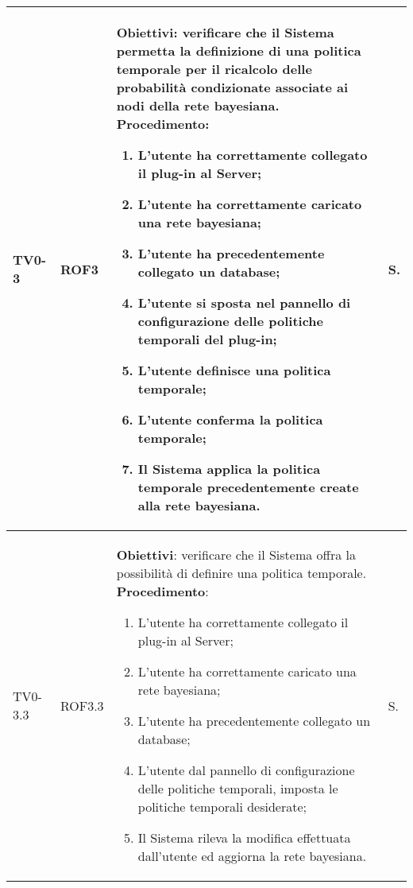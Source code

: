\begin{longtable}{|C{.15\textwidth}|C{.13\textwidth}|m{.65\textwidth}|C{.08\textwidth}|}
TV0-3 & ROF3 &
	\textbf{Obiettivi}: verificare che il Sistema permetta la definizione di una politica temporale per il ricalcolo delle probabilità condizionate associate ai nodi della rete bayesiana. \newline
	\textbf{Procedimento}:
	\begin{enumerate}
		\item L'utente ha correttamente collegato il plug-in al Server;
		\item L'utente ha correttamente caricato una rete bayesiana;
		\item L'utente ha precedentemente collegato un database;
		\item L'utente si sposta nel pannello di configurazione delle politiche temporali del plug-in;
		\item L'utente definisce una politica temporale;
		\item L'utente conferma la politica temporale;
		\item Il Sistema applica la politica temporale precedentemente create alla rete bayesiana.
	\end{enumerate}
	& S. \\
\hline

TV0-3.3 & ROF3.3 &
	\textbf{Obiettivi}: verificare che il Sistema offra la possibilità di definire una politica temporale. \newline
	\textbf{Procedimento}:
	\begin{enumerate}
		\item L'utente ha correttamente collegato il plug-in al Server;
		\item L'utente ha correttamente caricato una rete bayesiana;
		\item L'utente ha precedentemente collegato un database;
		\item L'utente dal pannello di configurazione delle politiche temporali, imposta le politiche temporali desiderate;
		\item Il Sistema rileva la modifica effettuata dall'utente ed aggiorna la rete bayesiana.
	\end{enumerate}
	& S. \\
\hline


\end{longtable}
